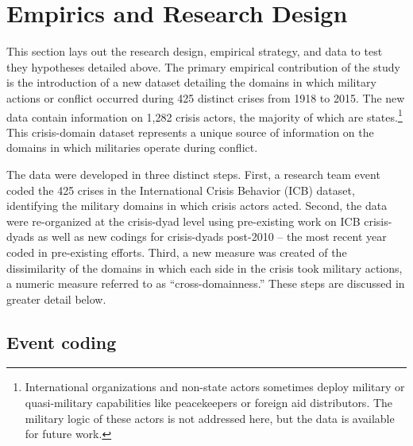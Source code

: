 \documentclass[
]{article}
\begin{document}
\hypertarget{empirics-and-research-design}{%
\section{Empirics and Research Design}\label{empirics-and-research-design}}

This section lays out the research design, empirical strategy, and data to test they hypotheses detailed above. The primary empirical contribution of the study is the introduction of a new dataset detailing the domains in which military actions or conflict occurred during 425 distinct crises from 1918 to 2015. The new data contain information on 1,282 crisis actors, the majority of which are states.\footnote{International organizations and non-state actors sometimes deploy military or quasi-military capabilities like peacekeepers or foreign aid distributors. The military logic of these actors is not addressed here, but the data is available for future work.} This crisis-domain dataset represents a unique source of information on the domains in which militaries operate during conflict.

The data were developed in three distinct steps. First, a research team event coded the 425 crises in the International Crisis Behavior (ICB) dataset, identifying the military domains in which crisis actors acted. Second, the data were re-organized at the crisis-dyad level using pre-existing work on ICB crisis-dyads as well as new codings for crisis-dyads post-2010 -- the most recent year coded in pre-existing efforts. Third, a new measure was created of the dissimilarity of the domains in which each side in the crisis took military actions, a numeric measure referred to as ``cross-domainness.'' These steps are discussed in greater detail below.

\hypertarget{event-coding}{%
\subsection{Event coding}\label{event-coding}}
\end{document}
